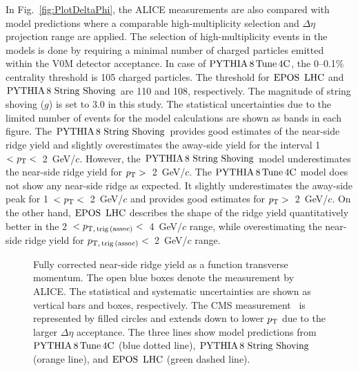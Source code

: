 In Fig.~\ref{fig:PlotDeltaPhi}, the ALICE measurements are also compared with model predictions where a comparable high-multiplicity selection and $\Delta\eta$ projection range are applied. The selection of high-multiplicity events in the models is done by requiring a minimal number of charged particles emitted within the V0M detector acceptance. In case of $\mathrm{PYTHIA}\,8\,\mathrm{Tune\,4C}$, the 0--0.1\% centrality threshold is 105 charged particles. The threshold for ${\mathrm{EPOS}\,~\mathrm{LHC}}$ and ${\mathrm{PYTHIA}\,8~\mathrm{String}~}\mathrm{Shoving}$ are 110 and 108, respectively. The magnitude of string shoving ($g$) is set to 3.0 in this study. The statistical uncertainties due to the limited number of events for the model calculations are shown as bands in each figure. The ${\mathrm{PYTHIA}\,8~\mathrm{String}~}\mathrm{Shoving}$ provides good estimates of the near-side ridge yield and slightly overestimates the away-side yield for the interval 1~$<\it{p}_{\rm{T}}<$~2~GeV/$c$. However, the ${\mathrm{PYTHIA}\,8~\mathrm{String}~}\mathrm{Shoving}$ model underestimates the near-side ridge yield for $\it{p}_{\rm{T}}>$~2~GeV/$c$. The $\mathrm{PYTHIA}\,8\,\mathrm{Tune\,4C}$ model does not show any near-side ridge as expected. It slightly underestimates the away-side peak for 1~$<\it{p}_{\rm{T}}<$~2~GeV/$c$ and provides good estimates for $\it{p}_{\rm{T}}>$~2~GeV/$c$. On the other hand, ${\mathrm{EPOS}\,~\mathrm{LHC}}$ describes the shape of the ridge yield quantitatively better in the 2~$<p_\mathrm{T,\,trig\,(assoc)}<$~4~GeV/$c$ range, while overestimating the near-side ridge yield for $p_\mathrm{T,\,trig\,(assoc)}<$~2~GeV/$c$ range. 


\begin{figure}[h!]
	\centering
	\caption{ Fully corrected near-side ridge yield as a function transverse momentum. The open blue boxes denote the measurement by ALICE. The statistical and systematic uncertainties are shown as vertical bars and boxes, respectively. The CMS measurement~\cite{Khachatryan:2015lva} is represented by filled circles and extends down to lower $p_\mathrm{T}$ due to the larger $\Delta\eta$ acceptance. The three lines show model predictions from $\mathrm{PYTHIA}\,8\,\mathrm{Tune\,4C}$ (blue dotted line), ${\mathrm{PYTHIA}\,8~\mathrm{String}~}\mathrm{Shoving}$ (orange line), and ${\mathrm{EPOS}\,~\mathrm{LHC}}$ (green dashed line).}
	\label{fig:PlotYSpect}
\end{figure}

